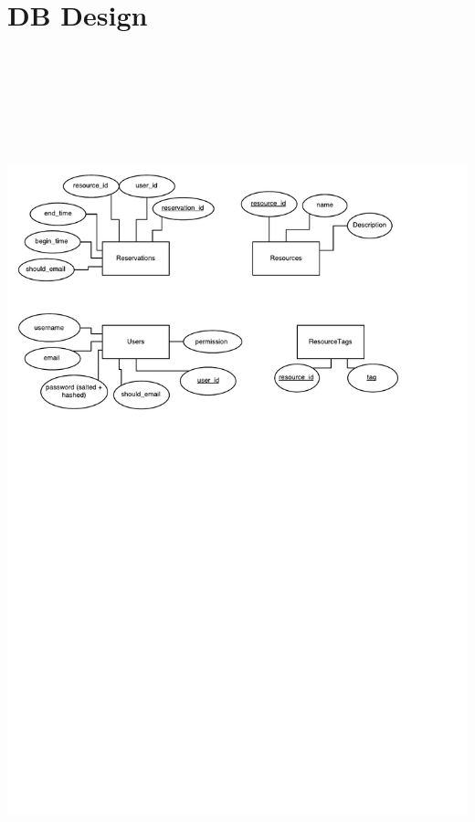 \documentclass[12pt]{article}
\begin{document}
\section{DB Design}
\label{appendix:DBDesign}
\includegraphics[height=10in]{Evolution1DB.pdf}
\end{document}
